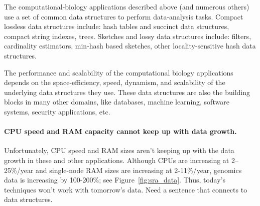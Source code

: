 The computational-biology applications described above (and numerous others)  use a set of common data structures to perform data-analysis tasks. 
Compact lossless data structures include: hash tables and succinct data structures, compact string indexes, trees.
Sketches and lossy data structures include: filters, cardinality estimators,  min-hash based sketches, other locality-sensitive hash data structures. 





The performance and scalability of the computational biology applications
depends on the space-efficiency, speed, dynamism, and scalability of the
underlying data structures they use. These data structures are also the building
blocks in many other domains, like databases, machine learning, software
systems, security applications, etc.


\paragraph{CPU speed and RAM capacity cannot keep up with data growth.}
Unfortunately, CPU speed and RAM sizes aren't keeping up with the data growth in these and other applications. 
Although CPUs are increasing at 2--25\%/year and single-node RAM sizes are increasing at 2-11\%/year, genomics data is increasing by 100-200\%; see Figure~\ref{fig:sra_data}.
Thus, today's techniques won't work with tomorrow's data. 
Need a sentence that connects to data structures.

